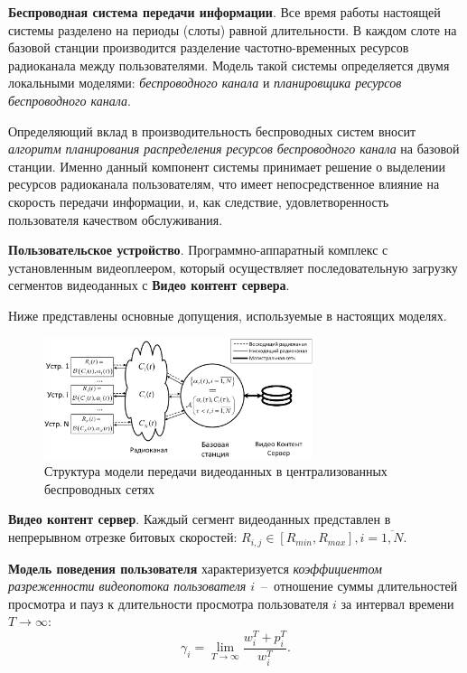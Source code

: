 \textbf{Беспроводная система передачи информации}. Все время работы настоящей системы разделено на периоды (слоты) равной длительности. В каждом слоте на базовой станции производится разделение частотно-временных ресурсов радиоканала между пользователями. Модель такой системы определяется двумя локальными моделями: \textit{беспроводного канала} и \textit{планировщика ресурсов беспроводного канала}.

Определяющий вклад в производительность беспроводных систем вносит \textit{алгоритм планирования распределения ресурсов беспроводного канала} на базовой станции. Именно данный компонент системы принимает решение о выделении ресурсов радиоканала пользователям, что имеет непосредственное влияние на скорость передачи информации, и, как следствие, удовлетворенность пользователя качеством обслуживания.

\textbf{Пользовательское устройство}. Программно-аппаратный комплекс с установленным видеоплеером, который осуществляет последовательную загрузку сегментов видеоданных с \textbf{Видео контент сервера}.

Ниже представлены основные допущения, используемые в настоящих моделях.

\begin{figure}[htbp]
\begin{center}
\includegraphics[width=0.7\textwidth]{../Dissertation/images/Chapter2/SystemModelEch.pdf}
\caption{Структура модели передачи видеоданных в централизованных беспроводных сетях}
\label{fig:SystemModel}
\end{center}
\end{figure}

\textbf{Видео контент сервер}. Каждый сегмент видеоданных представлен в непрерывном отрезке битовых скоростей: $R_{i,j} \in [R_{min}, R_{max}], i=\overline{1,N}$.

\textbf{Модель поведения пользователя} характеризуется \textit{коэффициентом разреженности видеопотока пользователя $i$}~--~отношение суммы длительностей просмотра и пауз к длительности просмотра пользователя $i$ за интервал времени $T\rightarrow\infty$:
$$\gamma_i = \lim\limits_{T\rightarrow\infty} \frac{w_i^T + p_i^T}{w_i^T}.$$

